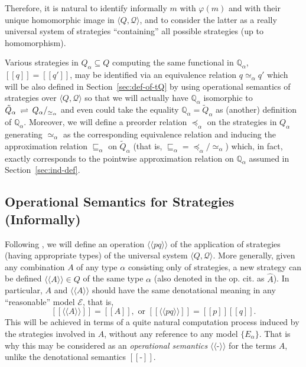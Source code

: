 \documentclass[fleqn]{LMCS}
\theoremstyle{plain}\newtheorem{satz}[thm]{Satz}
\theoremstyle{plain}\newtheorem{hyp}[thm]{Hypothesis}
\theoremstyle{plain}\newtheorem{hyps}[thm]{Hypotheses}
\theoremstyle{definition}\newtheorem{note}[thm]{Note}
\newcommand{\EE}{\mathcal{E}}
\newcommand{\defis}{\mbox{-}}
\newcommand{\setof}[1]{\{#1\}}
\newcommand{\bYdef}{\mathrel{\BYDEF}}
\newcommand{\BYDEF}{\mbox{$\hspace{.2em}\rightleftharpoons\hspace{.2em}$}}
\newcommand{\la}{\langle}
\newcommand{\ra}{\rangle}
\newcommand{\lla}{\langle\!\langle}
\newcommand{\rra}{\rangle\!\rangle}
\newcommand{\Osem}[1]{\lla #1 \rra}
\newcommand{\Dsem}[1]{[\![ #1 ]\!]}
\newcommand{\tuple}[1]{\la #1 \ra}
\newcommand{\bbQ}{\mathbb{Q}}
\newcommand{\QQ}{{\mathcal Q}}
\newcommand{\tQ}{\tilde{Q}}
\newcommand{\lee}{\preceq}
\newcommand{\sqle}{\sqsubseteq}
\newcommand{\?}{\mbox{?}}
\begin{document}
\noindent
Therefore, it is natural to identify informally $m$ with ${\varphi(m)}$ 
and with their unique homomorphic image in $\tuple{Q,\QQ}$, 
and to consider the latter as a really universal system of strategies ``containing'' 
all possible strategies (up to homomorphism). 


\medskip

Various strategies in $Q_{\alpha}\subseteq Q$ 
computing the same functional in $\bbQ_{\alpha}$, $\Dsem{q}=\Dsem{q'}$, 
may be identified via an equivalence relation $q\simeq_{\alpha}q'$ 
which will be also defined in Section~\ref{sec:def-of-tQ} by using 
operational semantics of strategies 
over $\tuple{Q,\QQ}$ 
so that we will actually have
$\bbQ_{\alpha}$ isomorphic to $\tQ_{\alpha}\bYdef Q_{\alpha}/_{\simeq_{\alpha}}$ 
and even could take the equality
$\bbQ_{\alpha} = \tQ_{\alpha}$ as (another) definition of $\bbQ_{\alpha}$.
Moreover, we will define a preorder relation $\lee_{\alpha}$ 
on the strategies in $Q_{\alpha}$ generating $\simeq_{\alpha}$ 
as the corresponding equivalence relation 
and inducing the approximation relation 
$\sqle_{\alpha}$ on $\tQ_{\alpha}$ 
(that is, ${\sqle_{\alpha}} = {\lee_{\alpha}/\simeq_{\alpha}}$) 
which, in fact, exactly corresponds to the pointwise approximation 
relation on $\bbQ_\alpha$ assumed in Section~\ref{sec:ind-def}.

\subsection{Operational Semantics for Strategies (Informally)}
\label{sec:operational-sem-informal}

\noindent
Following \cite{Saz76SMZH}, we will define an operation $\Osem{pq}$ 
of the application of strategies (having appropriate types) 
of the universal system $\tuple{Q,\QQ}$. 
More generally, given any combination 
$A$ of any type $\alpha$ 
consisting only of strategies, 
a new strategy can be defined $\Osem{A} \in Q$ of the same type $\alpha$ 
(also denoted in the op. cit. as $\hat{A}$). 
In particular, $A$ and $\Osem{A}$ should have the same denotational meaning 
in any ``reasonable'' model $\EE$, that is, 
\[
\Dsem{\Osem{A}}=\Dsem{A},\textrm{ or }
\Dsem{\Osem{pq}}=\Dsem{p}\Dsem{q}.
\]
This will be achieved in terms of 
a quite natural computation 
process induced by the strategies involved in $A$, without any reference 
to any model $\setof{E_\alpha}$. That is why this may be considered 
as an \emph{operational semantics} $\Osem{\defis}$ for the terms $A$, 
unlike the denotational semantics $\Dsem{\defis}$.
\end{document}
